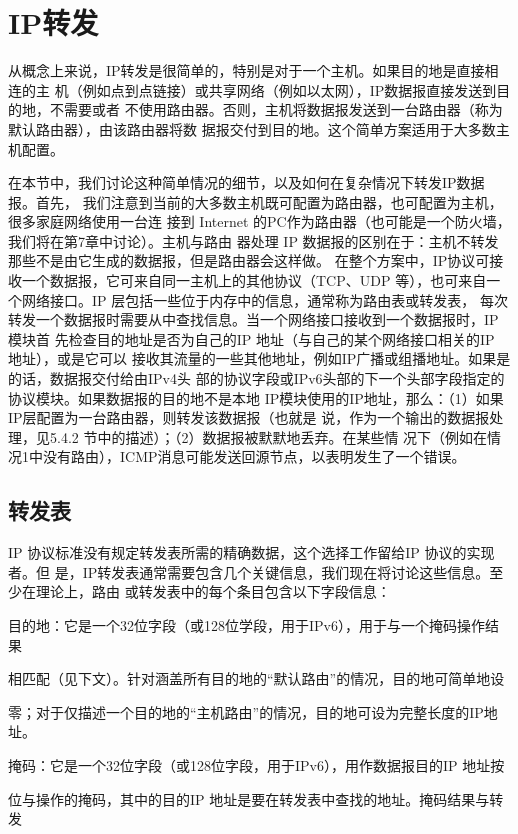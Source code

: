 \section{IP转发}

从概念上来说，IP转发是很简单的，特别是对于一个主机。如果目的地是直接相连的主
机（例如点到点链接）或共享网络（例如以太网），IP数据报直接发送到目的地，不需要或者
不使用路由器。否则，主机将数据报发送到一台路由器（称为默认路由器），由该路由器将数
据报交付到目的地。这个简单方案适用于大多数主机配置。

在本节中，我们讨论这种简单情况的细节，以及如何在复杂情况下转发IP数据报。首先，
我们注意到当前的大多数主机既可配置为路由器，也可配置为主机，很多家庭网络使用一台连
接到 Internet 的PC作为路由器（也可能是一个防火墙，我们将在第7章中讨论）。主机与路由
器处理 IP 数据报的区别在于：主机不转发那些不是由它生成的数据报，但是路由器会这样做。
在整个方案中，IP协议可接收一个数据报，它可来自同一主机上的其他协议（TCP、UDP
等），也可来自一个网络接口。IP 层包括一些位于内存中的信息，通常称为路由表或转发表，
每次转发一个数据报时需要从中查找信息。当一个网络接口接收到一个数据报时，IP模块首
先检查目的地址是否为自己的IP 地址（与自己的某个网络接口相关的IP 地址），或是它可以
接收其流量的一些其他地址，例如IP广播或组播地址。如果是的话，数据报交付给由IPv4头
部的协议字段或IPv6头部的下一个头部字段指定的协议模块。如果数据报的目的地不是本地
IP模块使用的IP地址，那么：（1）如果IP层配置为一台路由器，则转发该数据报（也就是
说，作为一个输出的数据报处理，见5.4.2 节中的描述）；（2）数据报被默默地丢弃。在某些情
况下（例如在情况1中没有路由），ICMP消息可能发送回源节点，以表明发生了一个错误。

\subsection{转发表}
IP 协议标准没有规定转发表所需的精确数据，这个选择工作留给IP 协议的实现者。但
是，IP转发表通常需要包含几个关键信息，我们现在将讨论这些信息。至少在理论上，路由
或转发表中的每个条目包含以下字段信息：

目的地：它是一个32位字段（或128位学段，用于IPv6），用于与一个掩码操作结果

相匹配（见下文）。针对涵盖所有目的地的“默认路由”的情况，目的地可简单地设

零；对于仅描述一个目的地的“主机路由”的情况，目的地可设为完整长度的IP地址。

 掩码：它是一个32位字段（或128位字段，用于IPv6），用作数据报目的IP 地址按

位与操作的掩码，其中的目的IP 地址是要在转发表中查找的地址。掩码结果与转发

